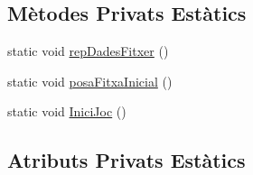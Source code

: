 \subsection*{Mètodes Privats Estàtics}
\begin{DoxyCompactItemize}
\item 
static void \mbox{\hyperlink{class_joc_afc0eb31677985cd98be8ed2debc31efa}{rep\+Dades\+Fitxer}} ()
\item 
static void \mbox{\hyperlink{class_joc_ab6a95f4790ad123e0fa5700cc984973e}{posa\+Fitxa\+Inicial}} ()
\item 
static void \mbox{\hyperlink{class_joc_ac38319889956e19c22ffd289ebd39824}{Inici\+Joc}} ()
\end{DoxyCompactItemize}
\subsection*{Atributs Privats Estàtics}
